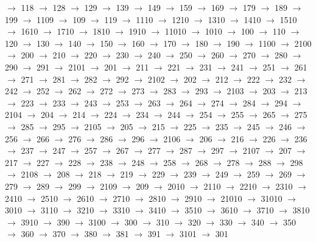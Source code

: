 $\rightarrow$ 118 $\rightarrow$ 128 $\rightarrow$ 129 $\rightarrow$ 139 $\rightarrow$ 149 $\rightarrow$ 159 $\rightarrow$ 169 $\rightarrow$ 179 $\rightarrow$ 189 $\rightarrow$ 199 $\rightarrow$ 1109 $\rightarrow$ 109 $\rightarrow$ 119 $\rightarrow$ 1110 $\rightarrow$ 1210 $\rightarrow$ 1310 $\rightarrow$ 1410 $\rightarrow$ 1510 $\rightarrow$ 1610 $\rightarrow$ 1710 $\rightarrow$ 1810 $\rightarrow$ 1910 $\rightarrow$ 11010 $\rightarrow$ 1010 $\rightarrow$ 100 $\rightarrow$ 110 $\rightarrow$ 120 $\rightarrow$ 130 $\rightarrow$ 140 $\rightarrow$ 150 $\rightarrow$ 160 $\rightarrow$ 170 $\rightarrow$ 180 $\rightarrow$ 190 $\rightarrow$ 1100 $\rightarrow$ 2100 $\rightarrow$ 200 $\rightarrow$ 210 $\rightarrow$ 220 $\rightarrow$ 230 $\rightarrow$ 240 $\rightarrow$ 250 $\rightarrow$ 260 $\rightarrow$ 270 $\rightarrow$ 280 $\rightarrow$ 290 $\rightarrow$ 291 $\rightarrow$ 2101 $\rightarrow$ 201 $\rightarrow$ 211 $\rightarrow$ 221 $\rightarrow$ 231 $\rightarrow$ 241 $\rightarrow$ 251 $\rightarrow$ 261 $\rightarrow$ 271 $\rightarrow$ 281 $\rightarrow$ 282 $\rightarrow$ 292 $\rightarrow$ 2102 $\rightarrow$ 202 $\rightarrow$ 212 $\rightarrow$ 222 $\rightarrow$ 232 $\rightarrow$ 242 $\rightarrow$ 252 $\rightarrow$ 262 $\rightarrow$ 272 $\rightarrow$ 273 $\rightarrow$ 283 $\rightarrow$ 293 $\rightarrow$ 2103 $\rightarrow$ 203 $\rightarrow$ 213 $\rightarrow$ 223 $\rightarrow$ 233 $\rightarrow$ 243 $\rightarrow$ 253 $\rightarrow$ 263 $\rightarrow$ 264 $\rightarrow$ 274 $\rightarrow$ 284 $\rightarrow$ 294 $\rightarrow$ 2104 $\rightarrow$ 204 $\rightarrow$ 214 $\rightarrow$ 224 $\rightarrow$ 234 $\rightarrow$ 244 $\rightarrow$ 254 $\rightarrow$ 255 $\rightarrow$ 265 $\rightarrow$ 275 $\rightarrow$ 285 $\rightarrow$ 295 $\rightarrow$ 2105 $\rightarrow$ 205 $\rightarrow$ 215 $\rightarrow$ 225 $\rightarrow$ 235 $\rightarrow$ 245 $\rightarrow$ 246 $\rightarrow$ 256 $\rightarrow$ 266 $\rightarrow$ 276 $\rightarrow$ 286 $\rightarrow$ 296 $\rightarrow$ 2106 $\rightarrow$ 206 $\rightarrow$ 216 $\rightarrow$ 226 $\rightarrow$ 236 $\rightarrow$ 237 $\rightarrow$ 247 $\rightarrow$ 257 $\rightarrow$ 267 $\rightarrow$ 277 $\rightarrow$ 287 $\rightarrow$ 297 $\rightarrow$ 2107 $\rightarrow$ 207 $\rightarrow$ 217 $\rightarrow$ 227 $\rightarrow$ 228 $\rightarrow$ 238 $\rightarrow$ 248 $\rightarrow$ 258 $\rightarrow$ 268 $\rightarrow$ 278 $\rightarrow$ 288 $\rightarrow$ 298 $\rightarrow$ 2108 $\rightarrow$ 208 $\rightarrow$ 218 $\rightarrow$ 219 $\rightarrow$ 229 $\rightarrow$ 239 $\rightarrow$ 249 $\rightarrow$ 259 $\rightarrow$ 269 $\rightarrow$ 279 $\rightarrow$ 289 $\rightarrow$ 299 $\rightarrow$ 2109 $\rightarrow$ 209 $\rightarrow$ 2010 $\rightarrow$ 2110 $\rightarrow$ 2210 $\rightarrow$ 2310 $\rightarrow$ 2410 $\rightarrow$ 2510 $\rightarrow$ 2610 $\rightarrow$ 2710 $\rightarrow$ 2810 $\rightarrow$ 2910 $\rightarrow$ 21010 $\rightarrow$ 31010 $\rightarrow$ 3010 $\rightarrow$ 3110 $\rightarrow$ 3210 $\rightarrow$ 3310 $\rightarrow$ 3410 $\rightarrow$ 3510 $\rightarrow$ 3610 $\rightarrow$ 3710 $\rightarrow$ 3810 $\rightarrow$ 3910 $\rightarrow$ 390 $\rightarrow$ 3100 $\rightarrow$ 300 $\rightarrow$ 310 $\rightarrow$ 320 $\rightarrow$ 330 $\rightarrow$ 340 $\rightarrow$ 350 $\rightarrow$ 360 $\rightarrow$ 370 $\rightarrow$ 380 $\rightarrow$ 381 $\rightarrow$ 391 $\rightarrow$ 3101 $\rightarrow$ 301 